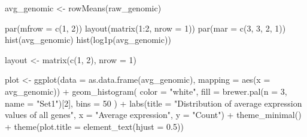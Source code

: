 \documentclass[
  letterpaper,
  DIV=11,
  numbers=noendperiod]{scrartcl}
\newenvironment{Shaded}{\begin{snugshade}}{\end{snugshade}}
\newcommand{\AttributeTok}[1]{\textcolor[rgb]{0.40,0.45,0.13}{#1}}
\newcommand{\DecValTok}[1]{\textcolor[rgb]{0.68,0.00,0.00}{#1}}
\newcommand{\FloatTok}[1]{\textcolor[rgb]{0.68,0.00,0.00}{#1}}
\newcommand{\FunctionTok}[1]{\textcolor[rgb]{0.28,0.35,0.67}{#1}}
\newcommand{\NormalTok}[1]{\textcolor[rgb]{0.00,0.23,0.31}{#1}}
\newcommand{\OtherTok}[1]{\textcolor[rgb]{0.00,0.23,0.31}{#1}}
\newcommand{\SpecialCharTok}[1]{\textcolor[rgb]{0.37,0.37,0.37}{#1}}
\newcommand{\StringTok}[1]{\textcolor[rgb]{0.13,0.47,0.30}{#1}}
\begin{document}
\begin{Shaded}
\begin{Highlighting}[]
\NormalTok{avg\_genomic }\OtherTok{\textless{}{-}} \FunctionTok{rowMeans}\NormalTok{(raw\_genomic)}

\FunctionTok{par}\NormalTok{(}\AttributeTok{mfrow =} \FunctionTok{c}\NormalTok{(}\DecValTok{1}\NormalTok{, }\DecValTok{2}\NormalTok{))}
\FunctionTok{layout}\NormalTok{(}\FunctionTok{matrix}\NormalTok{(}\DecValTok{1}\SpecialCharTok{:}\DecValTok{2}\NormalTok{, }\AttributeTok{nrow =} \DecValTok{1}\NormalTok{))}
\FunctionTok{par}\NormalTok{(}\AttributeTok{mar =} \FunctionTok{c}\NormalTok{(}\DecValTok{3}\NormalTok{, }\DecValTok{3}\NormalTok{, }\DecValTok{2}\NormalTok{, }\DecValTok{1}\NormalTok{)) }
\FunctionTok{hist}\NormalTok{(avg\_genomic)}
\FunctionTok{hist}\NormalTok{(}\FunctionTok{log1p}\NormalTok{(avg\_genomic))}

\NormalTok{layout }\OtherTok{\textless{}{-}} \FunctionTok{matrix}\NormalTok{(}\FunctionTok{c}\NormalTok{(}\DecValTok{1}\NormalTok{, }\DecValTok{2}\NormalTok{), }\AttributeTok{nrow =} \DecValTok{1}\NormalTok{)}

\NormalTok{plot }\OtherTok{\textless{}{-}} \FunctionTok{ggplot}\NormalTok{(}\AttributeTok{data =} \FunctionTok{as.data.frame}\NormalTok{(avg\_genomic), }\AttributeTok{mapping =} \FunctionTok{aes}\NormalTok{(}\AttributeTok{x =}\NormalTok{ avg\_genomic)) }\SpecialCharTok{+}
  \FunctionTok{geom\_histogram}\NormalTok{(}
    \AttributeTok{color =} \StringTok{"white"}\NormalTok{,}
    \AttributeTok{fill =} \FunctionTok{brewer.pal}\NormalTok{(}\AttributeTok{n =} \DecValTok{3}\NormalTok{, }\AttributeTok{name =} \StringTok{"Set1"}\NormalTok{)[}\DecValTok{2}\NormalTok{],}
    \AttributeTok{bins =} \DecValTok{50}
\NormalTok{  ) }\SpecialCharTok{+}
  \FunctionTok{labs}\NormalTok{(}\AttributeTok{title =} \StringTok{"Distribution of average expression values of all genes"}\NormalTok{,}
       \AttributeTok{x =} \StringTok{"Average expression"}\NormalTok{,}
       \AttributeTok{y =} \StringTok{"Count"}\NormalTok{) }\SpecialCharTok{+}
  \FunctionTok{theme\_minimal}\NormalTok{() }\SpecialCharTok{+}
  \FunctionTok{theme}\NormalTok{(}\AttributeTok{plot.title =} \FunctionTok{element\_text}\NormalTok{(}\AttributeTok{hjust =} \FloatTok{0.5}\NormalTok{))}


\end{Highlighting}
\end{Shaded}
\end{document}
